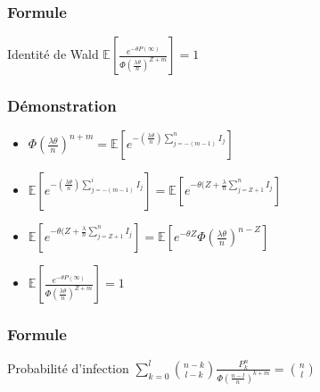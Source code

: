 \begin{frame}
	\frametitle{Formule}
	\begin{block}{Identité de Wald}
          $\mathbb{E}[ \frac{ e^{-\theta P(\infty)} }{ \Phi( \frac{\lambda \theta}{n})^{Z + m} } ] = 1 $
	\end{block}	
\end{frame}

\begin{frame}
	\frametitle{Démonstration}
	\begin{itemize}
	\item $ \Phi( \frac{\lambda \theta}{n})^{n + m} = \mathbb{E}[e^{-(\frac{\lambda \theta}{n}) \sum^n_{j = - (m-1)} I_j }]$
	\item $ \mathbb{E}[e^{-(\frac{\lambda \theta}{n}) \sum^i_{j = - (m-1)} I_j }]= \mathbb{E}[e^{- \theta(Z+\frac{\lambda}{n} \sum^n_{j = Z+1} I_j }]$
	\item $\mathbb{E}[e^{- \theta(Z+\frac{\lambda}{n} \sum^n_{j = Z+1} I_j }]=\mathbb{E}[e^{- \theta Z}\Phi( \frac{\lambda \theta}{n})^{n - Z}]$
	\item $\mathbb{E}[ \frac{ e^{-\theta P(\infty)} }{ \Phi( \frac{\lambda \theta}{n})^{Z + m} } ] = 1$
	\end{itemize}
\end{frame}

\begin{frame}
	\frametitle{Formule}
	
	\begin{block}{Probabilité d'infection }
          $\sum_{k=0}^{l}\binom{n-k}{l-k}\frac{P_{k}^{n}}{\Phi( \frac{n-l}{n})^{k + m} }=\binom{n}{l}$
	\end{block}

\end{frame}


